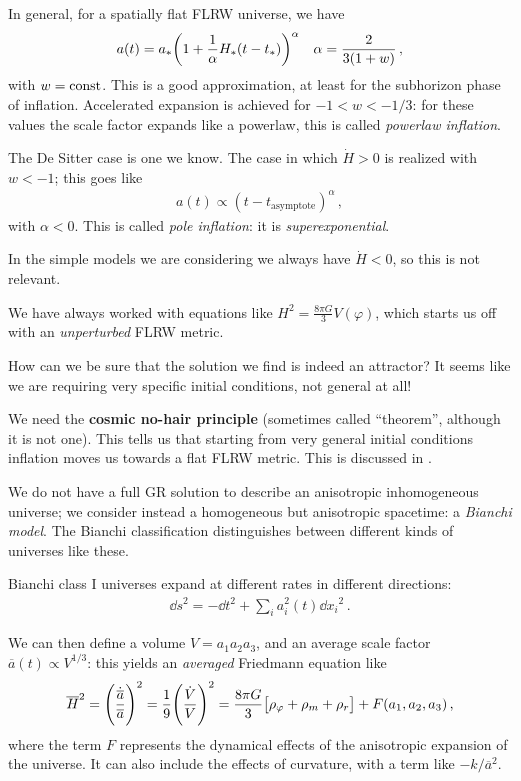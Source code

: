 \documentclass[main.tex]{subfiles}
\begin{document}
In general, for a spatially flat FLRW universe, we have 
%
\begin{align}
a(t) = a_* \qty(1 + \frac{1}{\alpha } H_*(t- t_*))^{\alpha }
&& \alpha = \frac{2}{3 (1+w)}
\,,
\end{align}
%
with \(w = \text{const}\). This is a good approximation, at least for the subhorizon phase of inflation.
Accelerated expansion is achieved for \(-1 < w < - 1/3\): for these values the scale factor expands like a powerlaw, this is called \emph{powerlaw inflation}. 

The De Sitter case is one we know. 
The case in which \(\dot{H} >0\) is realized with \(w < -1\); this goes like 
%
\begin{align}
a(t ) \propto (t-t _{\text{asymptote}})^{\alpha } 
\,,
\end{align}
%
with \(\alpha < 0\). This is called \emph{pole inflation}: it is \emph{superexponential}. 

In the simple models we are considering we always have \(\dot{H} < 0 \), so this is not relevant. 

We have always worked with equations like \(H^2 = \frac{8 \pi G}{3} V(\varphi )\), which starts us off with an \emph{unperturbed} FLRW metric.

How can we be sure that the solution we find is indeed an attractor? It seems like we are requiring very specific initial conditions, not general at all! 

We need the \textbf{cosmic no-hair principle} (sometimes called ``theorem'', although it is not one).
This tells us that starting from very general initial conditions inflation moves us towards a flat FLRW metric. 
This is discussed in \textcite[]{kolbEarlyUniverse1994}. 

We do not have a full GR solution to describe an anisotropic inhomogeneous universe; we consider instead a homogeneous but anisotropic spacetime: a \emph{Bianchi model}. 
The Bianchi classification distinguishes between different kinds of universes like these. 

Bianchi class I universes expand at different rates in different directions: 
%
\begin{align}
\dd{s^2} = - \dd{t}^2 + \sum _{i} a_i^2 (t) \dd{x_i}^2
\,.
\end{align}

We can then define a volume \(V = a_1 a_2 a_3 \), and an average scale factor \(\overline{a} (t) \propto V^{1/3}\): this yields an \emph{averaged} Friedmann equation like 
%
\begin{align}
\overline{H}^2 = \qty(\frac{\dot{\overline{a}}}{\overline{a}})^2 = \frac{1}{9} \qty(\frac{\dot{V}}{V})^2
 = \frac{8 \pi G}{3} \qty[\rho _\varphi + \rho _m + \rho _r]
 + F(a_1, a_2, a_3 )
\,,
\end{align}
%
where the term \(F\) represents the dynamical effects of the anisotropic expansion of the universe. 
It can also include the effects of curvature, with a term like \(- k / \overline{a}^2\).
\end{document}
